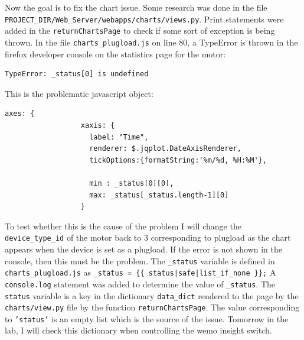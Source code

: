 \documentclass[fontsize=11pt, %
                             paper=letter, %
                             twoside, %
                             captions=tableheading,
                             index=totoc,
                             hyperref]{labbook}
\begin{document}
\begin{addmargin}[0cm]{0cm}
\bigbreak\noindent
Now the goal is to fix the chart issue. Some research was done in the file\\
\texttt{PROJECT\_DIR/Web\_Server/webapps/charts/views.py}. 
Print statements were added in the \texttt{returnChartsPage} to check if some sort of exception is being thrown. In the file \texttt{charts\_plugload.js} on line 80, a TypeError is thrown in the firefox developer console on the statistics page for the motor:
\begin{verbatim}
TypeError: _status[0] is undefined
\end{verbatim}
This is the problematic javascript object:
\begin{verbatim}
axes: {
			      xaxis: {
			        label: "Time",
			        renderer: $.jqplot.DateAxisRenderer,
			        tickOptions:{formatString:'%m/%d, %H:%M'},

		            min : _status[0][0],
		            max: _status[_status.length-1][0]
			      }
\end{verbatim}
To test whether this is the cause of the problem I will change the \texttt{device\_type\_id} of the motor back to $3$ corresponding to plugload as the chart appears when the device is set as a plugload. If the error is not shown in the console, then this must be the problem. The \texttt{\_status} variable is defined in \texttt{charts\_plugload.js} as \texttt{\_status = \{\{ status|safe|list\_if\_none \}\};} A \texttt{console.log} statement was added to determine the value of \texttt{\_status}. The \texttt{status} variable is a key in the dictionary \texttt{data\_dict} rendered to the page by the \texttt{charts/view.py} file by the function \texttt{returnChartsPage}. The value corresponding to \texttt{'status'} is an empty list which is the source of the issue. Tomorrow in the lab, I will check this dictionary when controlling the wemo insight switch.


\end{addmargin}
\end{document}
